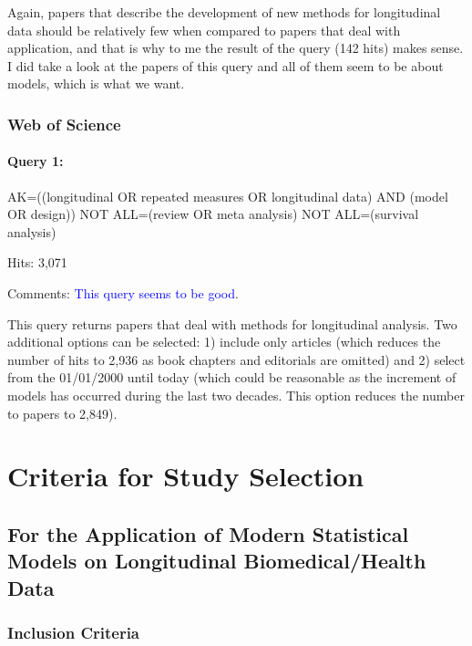 \documentclass[
]{article}
\let\oldparagraph\paragraph
\renewcommand{\paragraph}[1]{\oldparagraph{#1}\mbox{}}
\begin{document}
Again, papers that describe the development of new methods for
longitudinal data should be relatively few when compared to papers that
deal with application, and that is why to me the result of the query
(142 hits) makes sense. I did take a look at the papers of this query
and all of them seem to be about models, which is what we want.

\hypertarget{web-of-science-1}{%
\subsubsection{Web of Science}\label{web-of-science-1}}

\hypertarget{query-1-3}{%
\paragraph{Query 1:}\label{query-1-3}}

AK=((longitudinal OR repeated measures OR longitudinal data) AND (model
OR design)) NOT ALL=(review OR meta analysis) NOT ALL=(survival
analysis)

Hits: 3,071

Comments: \textcolor{blue}{This query seems to be good}.

This query returns papers that deal with methods for longitudinal
analysis. Two additional options can be selected: 1) include only
articles (which reduces the number of hits to 2,936 as book chapters and
editorials are omitted) and 2) select from the 01/01/2000 until today
(which could be reasonable as the increment of models has occurred
during the last two decades. This option reduces the number to papers to
2,849).

\hypertarget{criteria-for-study-selection}{%
\section{Criteria for Study
Selection}\label{criteria-for-study-selection}}

\hypertarget{for-the-application-of-modern-statistical-models-on-longitudinal-biomedicalhealth-data}{%
\subsection{For the Application of Modern Statistical Models on
Longitudinal Biomedical/Health
Data}\label{for-the-application-of-modern-statistical-models-on-longitudinal-biomedicalhealth-data}}

\hypertarget{inclusion-criteria}{%
\subsubsection{Inclusion Criteria}\label{inclusion-criteria}}
\end{document}
